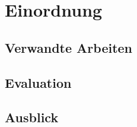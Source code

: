 \section{Einordnung}
\label{ch:comparison}
\subsection{Verwandte Arbeiten}
\label{ch:related}
\subsection{Evaluation}
\label{ch:evaluation}
\subsection{Ausblick}
\label{ch:future}
